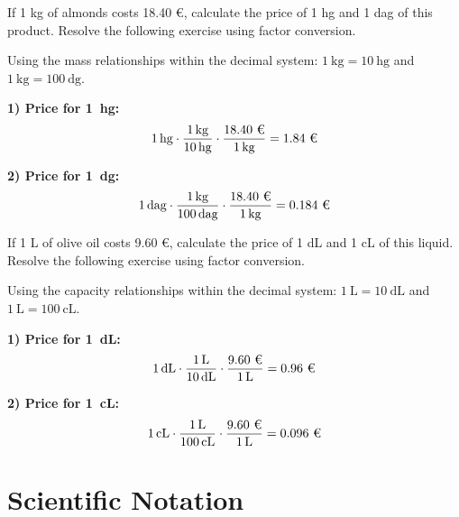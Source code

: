 \begin{exercise}
    If 1 kg of almonds costs 18.40 €, calculate the price of 1 hg and 1 dag of this product. Resolve the following exercise using factor conversion.

    \begin{solu}
        Using the mass relationships within the decimal system: \( \qty{1}{\kg} = \qty{10}{\hecto\g} \) and \( \qty{1}{\kg} = \qty{100}{\deca\g} \).

        \textbf{1) Price for \qty{1}{\hecto\g}:}
        \[
        \qty{1}{\cancel{\hecto\g}} \cdot
        \frac{\qty{1}{\cancel{\kg}}}{\qty{10}{\cancel{\hecto\g}}} \cdot
        \frac{\text{18.40 €}}{\qty{1}{\cancel{\kg}}}
        = \text{1.84 €}
        \]

        \textbf{2) Price for \qty{1}{\deca\g}:}
        \[
        \qty{1}{\cancel{\deca\g}} \cdot
        \frac{\qty{1}{\cancel{\kg}}}{\qty{100}{\cancel{\deca\g}}} \cdot
        \frac{\text{18.40 €}}{\qty{1}{\cancel{\kg}}}
        = \text{0.184 €}
        \]
    \end{solu}

\end{exercise}

\begin{exercise}
    If 1 L of olive oil costs 9.60 €, calculate the price of 1 dL and 1 cL of this liquid. Resolve the following exercise using factor conversion.

    \begin{solu}
        Using the capacity relationships within the decimal system: \( \qty{1}{\L} = \qty{10}{\deci\L} \) and \( \qty{1}{\L} = \qty{100}{\centi\L} \).

        \textbf{1) Price for \qty{1}{\deci\L}:}
        \[
        \qty{1}{\cancel{\deci\L}} \cdot
        \frac{\qty{1}{\cancel{\L}}}{\qty{10}{\cancel{\deci\L}}} \cdot
        \frac{\text{9.60 €}}{\qty{1}{\cancel{\L}}}
        = \text{0.96 €}
        \]

        \textbf{2) Price for \qty{1}{\centi\L}:}
        \[
        \qty{1}{\cancel{\centi\L}} \cdot
        \frac{\qty{1}{\cancel{\L}}}{\qty{100}{\cancel{\centi\L}}} \cdot
        \frac{\text{9.60 €}}{\qty{1}{\cancel{\L}}}
        = \text{0.096 €}
        \]
    \end{solu}

\end{exercise}


\section{Scientific Notation}

